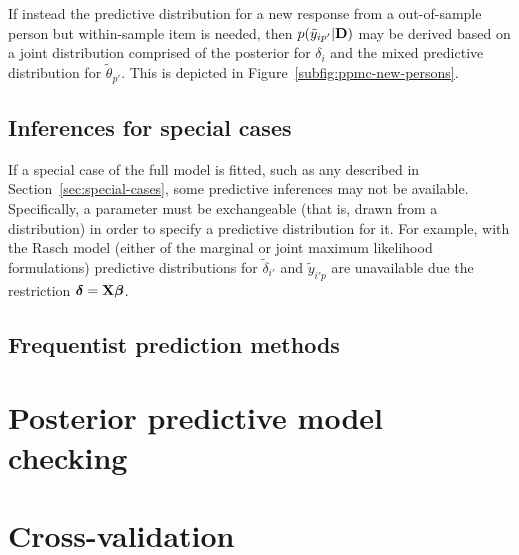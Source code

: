 \documentclass[12pt, letterpaper]{article}
\begin{document}
If instead the predictive distribution for a new response from a out-of-sample person but within-sample item is needed, then $p(\tilde y_{ip'} | \mathbf{D})$ may be derived based on a joint distribution comprised of the posterior for $\delta_{i}$ and the mixed predictive distribution for $\tilde \theta_{p'}$. This is depicted in Figure~\ref{subfig:ppmc-new-persons}.


\subsection{Inferences for special cases}

If a special case of the full model is fitted, such as any described in Section~\ref{sec:special-cases}, some predictive inferences may not be available. Specifically, a parameter must be exchangeable (that is, drawn from a distribution) in order to specify a predictive distribution for it. For example, with the Rasch model (either of the marginal or joint maximum likelihood formulations) predictive distributions for $\tilde \delta_{i'}$ and $\tilde y_{i'p}$ are unavailable due the restriction $\boldsymbol{\delta} = \mathbf{X} \boldsymbol{\beta}$. 



\subsection{Frequentist prediction methods}

\section{Posterior predictive model checking}

\section{Cross-validation}
\end{document}
